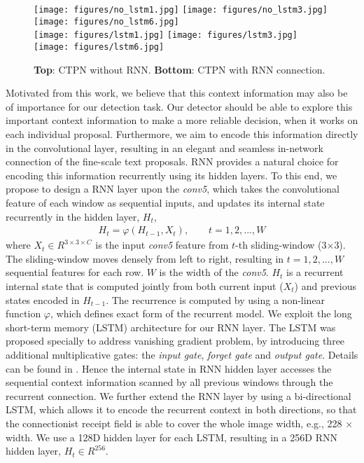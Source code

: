 \documentclass[runningheads]{llncs}
\begin{document}
 \begin{figure}[tb]
\centering
\texttt{[image: figures/no\_lstm1.jpg]}
\texttt{[image: figures/no\_lstm3.jpg]}
\texttt{[image: figures/no\_lstm6.jpg]}\\

\texttt{[image: figures/lstm1.jpg]}
\texttt{[image: figures/lstm3.jpg]}
\texttt{[image: figures/lstm6.jpg]}
\caption{\textbf{Top}: CTPN without RNN. \textbf{Bottom}: CTPN with RNN connection.}
\label{fig:lstm}
\end{figure}

Motivated from this work, we believe that this context information may also be of importance for our detection task. 
Our detector should be able to explore this important context information to make a more reliable decision, when it works on each individual proposal.
Furthermore, we aim to encode this information directly in the convolutional layer, resulting in an elegant and seamless in-network connection of the fine-scale text proposals.
RNN provides a natural choice for encoding this information recurrently using its hidden layers. To this end, we propose to design a RNN layer upon the \textit{conv5}, which takes the convolutional feature of each window  as sequential inputs, and updates its internal state recurrently  in the hidden layer, $H_t$,
\begin{eqnarray}
H_{t}=\varphi(H_{t-1}, X_t),  \qquad t=1,2,...,W
\end{eqnarray}
where $X_t \in R^{3\times 3 \times C}$ is the input \textit{conv5} feature from $t$-th  sliding-window (3$\times$3). The sliding-window moves densely from left to right, resulting in $t=1,2,...,W$ sequential features for each row.  $W$ is the width of the \textit{conv5}. $H_t$ is a recurrent internal state that is  computed jointly from  both current input ($X_t$)  and previous states encoded in $H_{t-1}$. The recurrence is computed by using a non-linear function $\varphi$, which defines exact form of the recurrent model. We exploit the long
short-term memory (LSTM) architecture \cite{Hochreiter1997} for our RNN layer. The LSTM was proposed specially to address vanishing
gradient problem, by introducing three additional multiplicative gates: the \textit{input gate}, \textit{forget gate} and \textit{output gate}. Details can be found in \cite{Hochreiter1997}. Hence the internal state in RNN hidden layer accesses the sequential context information scanned by all previous windows through the recurrent connection.  We further extend the RNN layer by using a bi-directional LSTM, which allows it to encode the recurrent context in both directions, so that the connectionist receipt field is able to cover the whole image width, e.g., 228 $\times$ width. We use a 128D hidden layer for each LSTM, resulting in a 256D RNN hidden layer, $H_t \in R^{256}$.
\end{document}
